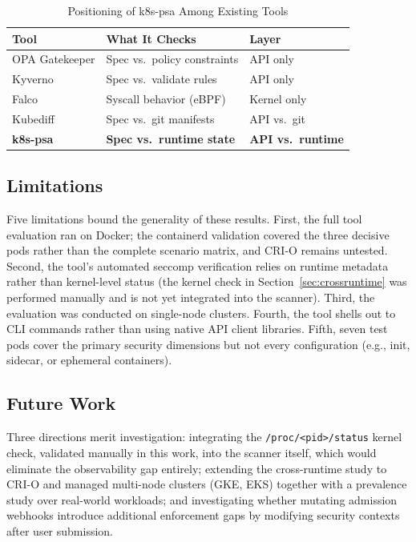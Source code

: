 \documentclass[conference]{IEEEtran}
\begin{document}
\begin{table}[htbp]
\caption{Positioning of k8s-psa Among Existing Tools}
\label{tab:tools}
\centering
\begin{tabular}{lll}
\toprule
\textbf{Tool} & \textbf{What It Checks} & \textbf{Layer} \\
\midrule
OPA Gatekeeper & Spec vs.\ policy constraints & API only \\
Kyverno        & Spec vs.\ validate rules & API only \\
Falco          & Syscall behavior (eBPF) & Kernel only \\
Kubediff       & Spec vs.\ git manifests & API vs.\ git \\
\textbf{k8s-psa} & \textbf{Spec vs.\ runtime state} & \textbf{API vs.\ runtime} \\
\bottomrule
\end{tabular}
\end{table}

\subsection{Limitations}

Five limitations bound the generality of these results. First, the full tool evaluation ran on Docker; the containerd validation covered the three decisive pods rather than the complete scenario matrix, and CRI-O remains untested. Second, the tool's automated seccomp verification relies on runtime metadata rather than kernel-level status (the kernel check in Section~\ref{sec:crossruntime} was performed manually and is not yet integrated into the scanner). Third, the evaluation was conducted on single-node clusters. Fourth, the tool shells out to CLI commands rather than using native API client libraries. Fifth, seven test pods cover the primary security dimensions but not every configuration (e.g., init, sidecar, or ephemeral containers).

\subsection{Future Work}

Three directions merit investigation: integrating the \texttt{/proc/<pid>/status} kernel check, validated manually in this work, into the scanner itself, which would eliminate the observability gap entirely; extending the cross-runtime study to CRI-O and managed multi-node clusters (GKE, EKS) together with a prevalence study over real-world workloads; and investigating whether mutating admission webhooks introduce additional enforcement gaps by modifying security contexts after user submission.
\end{document}
